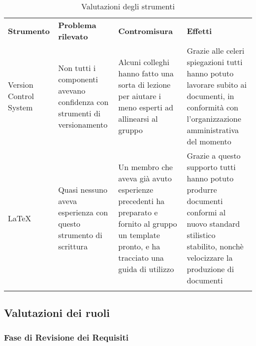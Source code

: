 \documentclass[../piano_di_qualifica.tex]{subfiles}
\begin{document}
\begin{center}
	\begin{longtable}{|p{2.5cm}|p{4.5cm}|p{4.5cm}|p{4.5cm}|}
		\hline
		\rowcolor{lightgray}
		\textbf{Strumento} & \textbf{Problema rilevato} & \textbf{Contromisura} & \textbf{Effetti} \\
		Version Control System & Non tutti i componenti avevano confidenza con strumenti di versionamento & Alcuni colleghi hanno fatto una sorta di lezione per aiutare i meno esperti ad allinearsi al gruppo & Grazie alle celeri spiegazioni tutti hanno potuto lavorare subito ai documenti, in conformità con l'organizzazione amministrativa del momento \\
		\LaTeX & Quasi nessuno aveva esperienza con questo strumento di scrittura & Un membro che aveva già avuto esperienze precedenti ha preparato e fornito al gruppo un template pronto, e ha tracciato una guida di utilizzo & Grazie a questo supporto tutti hanno potuto produrre documenti conformi al nuovo standard stilistico stabilito, nonchè velocizzare la produzione di documenti\\
		\hline
		\rowcolor{white}
		\caption{Valutazioni degli strumenti}
	\end{longtable}
\end{center}


\subsection{Valutazioni dei ruoli}
\label{sub:valut_ruoli}

\subsubsection{Fase di Revisione dei Requisiti}
\end{document}
